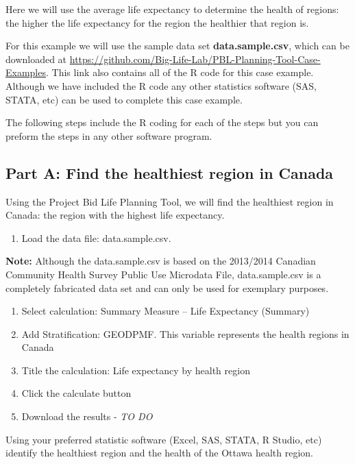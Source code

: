 \documentclass[]{book}
\providecommand{\tightlist}{%
  \setlength{\itemsep}{0pt}\setlength{\parskip}{0pt}}
\begin{document}
Here we will use the average life expectancy to determine the health of
regions: the higher the life expectancy for the region the healthier
that region is.

For this example we will use the sample data set
\textbf{data.sample.csv}, which can be downloaded at
\url{https://github.com/Big-Life-Lab/PBL-Planning-Tool-Case-Examples}.
This link also contains all of the R code for this case example.
Although we have included the R code any other statistics software (SAS,
STATA, etc) can be used to complete this case example.

The following steps include the R coding for each of the steps but you
can preform the steps in any other software program.

\subsection{Part A: Find the healthiest region in
Canada}\label{part-a-find-the-healthiest-region-in-canada}

Using the Project Bid Life Planning Tool, we will find the healthiest
region in Canada: the region with the highest life expectancy.

\begin{enumerate}
\def\labelenumi{\arabic{enumi}.}
\tightlist
\item
  Load the data file: data.sample.csv.
\end{enumerate}

\textbf{Note:} Although the data.sample.csv is based on the 2013/2014
Canadian Community Health Survey Public Use Microdata File,
data.sample.csv is a completely fabricated data set and can only be used
for exemplary purposes.

\begin{enumerate}
\def\labelenumi{\arabic{enumi}.}
\setcounter{enumi}{1}
\item
  Select calculation: Summary Measure -- Life Expectancy (Summary)
\item
  Add Stratification: GEODPMF. This variable represents the health
  regions in Canada
\item
  Title the calculation: Life expectancy by health region
\item
  Click the calculate button
\item
  Download the results - \emph{TO DO}
\end{enumerate}

Using your preferred statistic software (Excel, SAS, STATA, R Studio,
etc) identify the healthiest region and the health of the Ottawa health
region.
\end{document}

